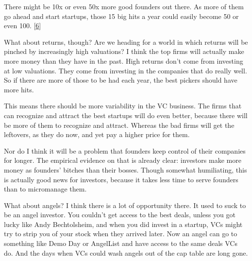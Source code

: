There might be 10x or even
                  50x more good founders out there. As more of them go ahead and
                  start startups, those 15 big hits a year could easily become
                  50 or even 100.
                  [\href{\#f6n}{6}]

What about returns, though? Are we heading for a
                  world in which returns will be pinched by increasingly high
                  valuations? I think the top firms will actually make more
                  money than they have in the past. High returns don't come from
                  investing at low valuations. They come from investing in the
                  companies that do really well. So if there are more of those
                  to be had each year, the best pickers should have more
                  hits.

This means there should be more variability
                  in the VC business. The firms that can recognize and attract
                  the best startups will do even better, because there will be
                  more of them to recognize and attract. Whereas the bad firms
                  will get the leftovers, as they do now, and yet pay a higher
                  price for them.

Nor do I think it will be a problem
                  that founders keep control of their companies for longer. The
                  empirical evidence on that is already clear: investors make
                  more money as founders' bitches than their bosses. Though
                  somewhat humiliating, this is actually good news for
                  investors, because it takes less time to serve founders than
                  to micromanage them.

What about angels? I think
                  there is a lot of opportunity there. It used to suck to be an
                  angel investor. You couldn't get access to the best deals,
                  unless you got lucky like Andy Bechtolsheim, and when you did
                  invest in a startup, VCs might try to strip you of your stock
                  when they arrived later. Now an angel can go to something like
                  Demo Day or AngelList and have access to the same deals VCs
                  do. And the days when VCs could wash angels out of the cap
                  table are long gone.


